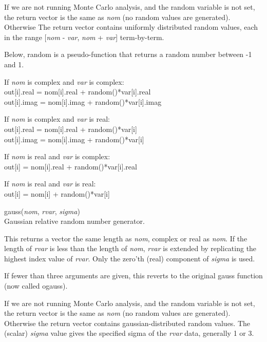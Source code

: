 \begin{description}
If we are not running Monte Carlo analysis, and the {\et random}
variable is not set, the return vector is the same as {\it nom} (no
random values are generated).  Otherwise The return vector contains
uniformly distributed random values, each in the range [{\it nom} -
{\it var\/}, {\it nom} + {\it var\/}] term-by-term.

Below, {\vt random} is a pseudo-function that returns a random number
between -1 and 1.

\begin{description}
\item{If {\it nom} is complex and {\it var} is complex:}\\
  {\vt out[i].real = nom[i].real + random()*var[i].real}\\
  {\vt out[i].imag = nom[i].imag + random()*var[i].imag}

\item{If {\it nom} is complex and {\it var} is real:}\\
  {\vt out[i].real = nom[i].real + random()*var[i]}\\
  {\vt out[i].imag = nom[i].imag + random()*var[i]}

\item{If {\it nom} is real and {\it var} is complex:}\\
  {\vt out[i] = nom[i].real + random()*var[i].real}

\item{If {\it nom} is real and {\it var} is real:}\\
  {\vt out[i] = nom[i] + random()*var[i]}
\end{description}

\item{\vt gauss}({\it nom\/}, {\it rvar\/},
  {\it sigma\/})\\
Gaussian relative random number generator.

This returns a vector the same length as {\it nom\/}, complex or real
as {\it nom\/}.  If the length of {\it rvar} is less than the length
of {\it nom\/}, {\it rvar} is extended by replicating the highest
index value of {\it rvar\/}.  Only the zero'th (real) component of
{\it sigma} is used.

If fewer than three arguments are given, this reverts to the original
{\WRspice} {\vt gauss} function (now called {\vt ogauss}).

If we are not running Monte Carlo analysis, and the {\et random}
variable is not set, the return vector is the same as {\it nom} (no
random values are generated).  Otherwise the return vector contains
gaussian-distributed random values.  The (scalar) {\it sigma} value
gives the specified sigma of the {\it rvar} data, generally 1 or 3.


\end{description}
